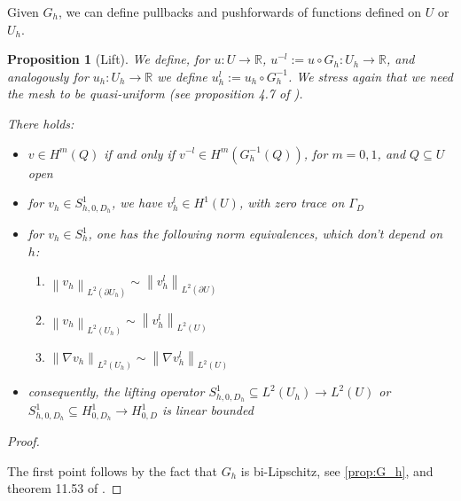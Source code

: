 \documentclass[english,a4paper,9pt,oneside]{scrbook}	%
\theoremstyle{break}
\newtheorem{prop}[equation]{Proposition}
\newenvironment{mproof}[1][\proofname]{%
  \begin{proof}[#1]$ $\par\nobreak\ignorespaces
}{%
  \end{proof}
}
\renewcommand*{\proofname}{Proof}
\theoremstyle{remark}
\newcommand{\mR}{\mathbb{R}}
\newcommand{\norm}[1]{\left\lVert#1\right\rVert}
\begin{document}
\begin{appendices}
Given $G_h$, we can define pullbacks and pushforwards of functions defined on $U$ or $U_h$.


\begin{prop}[Lift]
\label{prop:lift}
We define, for $u: U \rightarrow \mR$, $u^{-l}:=u\circ G_h : U_h \rightarrow \mR$, and analogously for $u_h: U_h \rightarrow \mR$ we define $u_h^l:=u_h\circ G_h^{-1}$. We stress again that we need the mesh to be quasi-uniform (see proposition 4.7 of \cite{elliott}).

There holds:

\begin{itemize}
	\item $v\in H^m(Q)$ if and only if $v^{-l} \in H^m(G_h^{-1}(Q))$, for $m=0,1$, and $Q\subseteq U$ open
	\item for $v_h \in S^1_{h,0,D_h}$, we have $v_h^l \in H^1(U)$, with zero trace on $\Gamma_D$ 
	\item for $v_h  \in S^1_h$, one has the following norm equivalences, which don't depend on $h$:
	\begin{enumerate}
		\item $\norm{v_h}_{L^2(\partial U_h)} \sim \norm{v_h^l}_{L^2(\partial U)}$
		\item $\norm{v_h}_{L^2( U_h)} \sim \norm{v_h^l}_{L^2( U)}$
		\item $\norm{\nabla v_h}_{L^2( U_h)} \sim \norm{\nabla v_h^l}_{L^2( U)}$
	\end{enumerate}
	\item consequently, the lifting operator $S^{1}_{h,0,D_h} \subseteq L^2(U_h) \rightarrow L^2(U)$ or $S^{1}_{h,0,D_h} \subseteq H^1_{0,D_h} \rightarrow H^1_{0,D}$ is linear bounded
	
\end{itemize}

\end{prop}

\begin{mproof}

The first point follows by the fact that $G_h$ is bi-Lipschitz, see \cref{prop:G_h}, and theorem 11.53 of \cite{leoni}.

%
%


\end{mproof}
\end{appendices}
\end{document}
